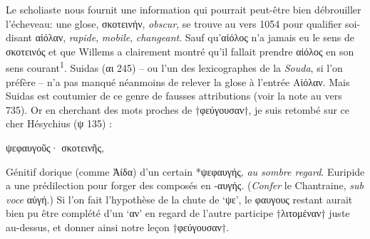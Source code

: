 \documentclass[12pt]{book}%
\newcommand{\italique}[1]{\textit{#1}}%
\newcommand{\citComm}[1]{\begin{quoting}[vskip=0pt] #1 \end{quoting}}%
\newlength{\larg}%
\newcommand{\marqueur}[1]{\textsuperscript{#1}}%
\newcommand{\eff}[1]{%
{\color{orange}#1}%
}%
\newenvironment{groupe}{%
\pstart%
\ledgroup%
}{%
\pend %
}%
\begin{document}
\begin{pages}
\begin{Leftside}
\begin{groupe}
{{Le scholiaste nous fournit une information qui pourrait peut-être bien débrouiller l'écheveau: une glose, σκοτεινήν, \italique{obscur}, se trouve au vers 1054 pour qualifier soi-disant αἰόλαν, \italique{rapide}, \italique{mobile}, \italique{changeant}. 
Sauf qu'αἰόλος n'a jamais eu le sens de σκοτεινός et que Willems a clairement montré qu'il fallait prendre αἰόλος en son sens courant\marqueur{1}.
Suidas (αι 245) -- ou l'un des lexicographes de la \italique{Souda}, si l'on préfère -- n'a pas manqué néanmoins de relever la glose à l'entrée Αἰόλαν. Mais Suidas est coutumier de ce genre de fausses attributions (voir la note au vers 735).
Or en cherchant des mots proches de †φεύγουσαν†, je suis retombé sur ce cher Hésychius (ψ 135) :%
\citComm{ψεφαυγοῦς· σκοτεινῆς,}%
Génitif dorique (comme Ἀίδα) d'un certain *ψεφαυγής, \italique{au sombre regard}.
Euripide a une prédilection pour forger des composés en -αυγής. (\italique{Confer} le Chantraine, \italique{sub voce} αὐγή.) 
Si l'on fait l'hypothèse de la chute de `ψε', le φαυγους restant aurait bien pu être complété d'un `αν' en regard de l'autre participe †λιτομέναν† juste au-dessus, et donner ainsi notre leçon †φεύγουσαν†.
}}
\end{groupe}
\end{Leftside}
\end{pages}
\end{document}
